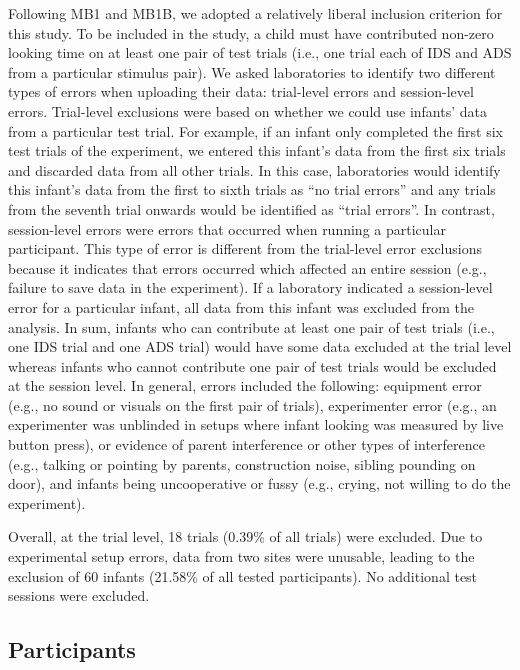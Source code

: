 \documentclass[
  ,man,floatsintext]{apa6}
\begin{document}
Following MB1 and MB1B, we adopted a relatively liberal inclusion criterion for this study. To be included in the study, a child must have contributed non-zero looking time on at least one pair of test trials (i.e., one trial each of IDS and ADS from a particular stimulus pair). We asked laboratories to identify two different types of errors when uploading their data: trial-level errors and session-level errors. Trial-level exclusions were based on whether we could use infants' data from a particular test trial. For example, if an infant only completed the first six test trials of the experiment, we entered this infant's data from the first six trials and discarded data from all other trials. In this case, laboratories would identify this infant's data from the first to sixth trials as ``no trial errors'' and any trials from the seventh trial onwards would be identified as ``trial errors''. In contrast, session-level errors were errors that occurred when running a particular participant. This type of error is different from the trial-level error exclusions because it indicates that errors occurred which affected an entire session (e.g., failure to save data in the experiment). If a laboratory indicated a session-level error for a particular infant, all data from this infant was excluded from the analysis. In sum, infants who can contribute at least one pair of test trials (i.e., one IDS trial and one ADS trial) would have some data excluded at the trial level whereas infants who cannot contribute one pair of test trials would be excluded at the session level. In general, errors included the following: equipment error (e.g., no sound or visuals on the first pair of trials), experimenter error (e.g., an experimenter was unblinded in setups where infant looking was measured by live button press), or evidence of parent interference or other types of interference (e.g., talking or pointing by parents, construction noise, sibling pounding on door), and infants being uncooperative or fussy (e.g., crying, not willing to do the experiment).

Overall, at the trial level, 18 trials (0.39\% of all trials) were excluded. Due to experimental setup errors, data from two sites were unusable, leading to the exclusion of 60 infants (21.58\% of all tested participants). No additional test sessions were excluded.

\hypertarget{participants}{%
\subsection{Participants}\label{participants}}
\end{document}
